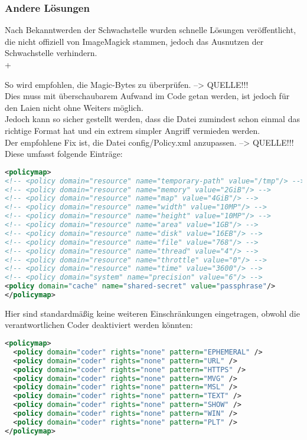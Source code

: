 \subsubsection{Andere Lösungen}

Nach Bekanntwerden der Schwachstelle wurden schnelle Lösungen veröffentlicht, die nicht offiziell von ImageMagick stammen, jedoch das Ausnutzen der Schwachstelle verhindern.\\+

So wird empfohlen, die Magic-Bytes zu überprüfen. --> QUELLE!!!\\
Dies muss mit überschaubarem Aufwand im Code getan werden, ist jedoch für den Laien nicht ohne Weiters möglich.\\
Jedoch kann so sicher gestellt werden, dass die Datei zumindest schon einmal das richtige Format hat und ein extrem simpler Angriff vermieden werden.\\

Der empfohlene Fix ist,  die Datei config/Policy.xml anzupassen. --> QUELLE!!!\\
Diese umfasst folgende Einträge:\\

\begin{lstlisting}[firstnumber=47, language=XML, caption=config/Policy.xml Inhalt,label={lst:lstlisting}]
<policymap>
<!-- <policy domain="resource" name="temporary-path" value="/tmp"/> -->
<!-- <policy domain="resource" name="memory" value="2GiB"/> -->
<!-- <policy domain="resource" name="map" value="4GiB"/> -->
<!-- <policy domain="resource" name="width" value="10MP"/> -->
<!-- <policy domain="resource" name="height" value="10MP"/> -->
<!-- <policy domain="resource" name="area" value="1GB"/> -->
<!-- <policy domain="resource" name="disk" value="16EB"/> -->
<!-- <policy domain="resource" name="file" value="768"/> -->
<!-- <policy domain="resource" name="thread" value="4"/> -->
<!-- <policy domain="resource" name="throttle" value="0"/> -->
<!-- <policy domain="resource" name="time" value="3600"/> -->
<!-- <policy domain="system" name="precision" value="6"/> -->
<policy domain="cache" name="shared-secret" value="passphrase"/>
</policymap>
\end{lstlisting}
\vspace{5mm}

Hier sind standardmäßig keine weiteren Einschränkungen eingetragen, obwohl die verantwortlichen Coder deaktiviert werden könnten:\\

\begin{lstlisting}[language=XML, caption=config/Policy.xml Inhalt,label={lst:lstlisting}]
<policymap>
  <policy domain="coder" rights="none" pattern="EPHEMERAL" />
  <policy domain="coder" rights="none" pattern="URL" />
  <policy domain="coder" rights="none" pattern="HTTPS" />
  <policy domain="coder" rights="none" pattern="MVG" />
  <policy domain="coder" rights="none" pattern="MSL" />
  <policy domain="coder" rights="none" pattern="TEXT" />
  <policy domain="coder" rights="none" pattern="SHOW" />
  <policy domain="coder" rights="none" pattern="WIN" />
  <policy domain="coder" rights="none" pattern="PLT" />
</policymap>
\end{lstlisting}
\vspace{5mm}

